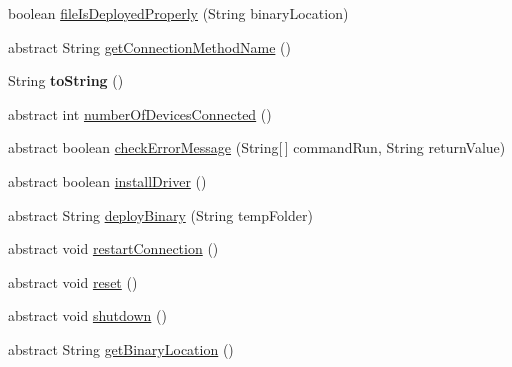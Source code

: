 \begin{DoxyCompactItemize}
\item 
boolean \hyperlink{class_c_a_s_u_a_l_1_1communicationstools_1_1_abstract_device_communications_protocol_a8df8be9cc0a84e10cd6ea7671af2f1b1}{file\-Is\-Deployed\-Properly} (String binary\-Location)
\item 
abstract String \hyperlink{class_c_a_s_u_a_l_1_1communicationstools_1_1_abstract_device_communications_protocol_ab81c290535076624c44b1ce08ce823b3}{get\-Connection\-Method\-Name} ()
\item 
\hypertarget{class_c_a_s_u_a_l_1_1communicationstools_1_1_abstract_device_communications_protocol_acd90b8f386e84144b851c90c20cf5450}{String {\bfseries to\-String} ()}\label{class_c_a_s_u_a_l_1_1communicationstools_1_1_abstract_device_communications_protocol_acd90b8f386e84144b851c90c20cf5450}

\item 
abstract int \hyperlink{class_c_a_s_u_a_l_1_1communicationstools_1_1_abstract_device_communications_protocol_a7133a942941bd206da3944667e154240}{number\-Of\-Devices\-Connected} ()
\item 
abstract boolean \hyperlink{class_c_a_s_u_a_l_1_1communicationstools_1_1_abstract_device_communications_protocol_ac31f16b05cb310dcbde9651d7a31c4e0}{check\-Error\-Message} (String\mbox{[}$\,$\mbox{]} command\-Run, String return\-Value)
\item 
abstract boolean \hyperlink{class_c_a_s_u_a_l_1_1communicationstools_1_1_abstract_device_communications_protocol_aceee4460b32e7378f74a41ce45c2ccef}{install\-Driver} ()
\item 
abstract String \hyperlink{class_c_a_s_u_a_l_1_1communicationstools_1_1_abstract_device_communications_protocol_ae43d1daab84383c3d7a544f6fb8bcf17}{deploy\-Binary} (String temp\-Folder)
\item 
abstract void \hyperlink{class_c_a_s_u_a_l_1_1communicationstools_1_1_abstract_device_communications_protocol_a997c2d99e76612350b8367e0a8919dbc}{restart\-Connection} ()
\item 
abstract void \hyperlink{class_c_a_s_u_a_l_1_1communicationstools_1_1_abstract_device_communications_protocol_a19717483b350ae780ef8ca86a1760ad9}{reset} ()
\item 
abstract void \hyperlink{class_c_a_s_u_a_l_1_1communicationstools_1_1_abstract_device_communications_protocol_a761816f9cf6221eceae2629b2252a930}{shutdown} ()
\item 
abstract String \hyperlink{class_c_a_s_u_a_l_1_1communicationstools_1_1_abstract_device_communications_protocol_ae90f2b1d24002a9956343e81371e352f}{get\-Binary\-Location} ()

\end{DoxyCompactItemize}
